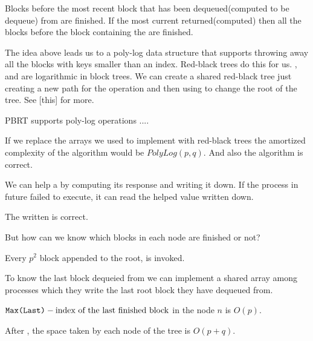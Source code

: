 \begin{lemma}
  Blocks before the most recent block that has been dequeued(computed to be dequeue) from are finished. If the most current  returned(computed)  then all the blocks before the block containing the  are finished.
\end{lemma}

The idea above leads us to a poly-log data structure that supports throwing away all the blocks with keys smaller than an index. Red-black trees do this for us. ,  and  are logarithmic in block trees.
We can create a shared red-black tree just creating a new path for the operation and then using  to change the root of the tree. See [this] for more.

\begin{observation}
PBRT supports poly-log operations ....
\end{observation}

\begin{lemma}
    If we replace the arrays we used to implement  with red-black trees the amortized complexity of the algorithm would be $PolyLog(p,q)$. And also the algorithm is correct.
\end{lemma}

We can help a  by computing its response and writing it down. If the process in future failed to execute, it can read the helped value written down.

\begin{lemma}
The  written is correct.
\end{lemma}

But how can we know which blocks in each node are finished or not? 

\begin{observation}
Every $p^2$ block appended to the root,  is invoked.  
\end{observation}

To know the last block dequeied from we can implement a shared array among processes which they write the last root block they have dequeued from. 

\begin{lemma}
    ${\normalfont{\texttt{Max(Last)}}} - \text{index of the last finished block}$ in the node $n$ is $O(p)$.
\end{lemma}

\begin{lemma}
    After , the space taken by each node of the tree is $O(p+q)$.
\end{lemma}

